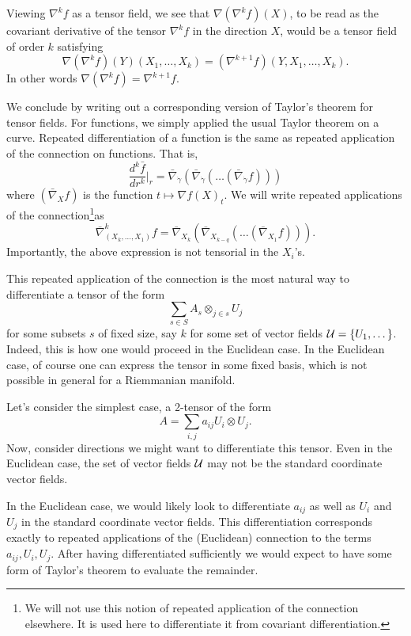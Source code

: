 \documentclass{article}
\begin{document}
Viewing $\nabla^{k} f$ as a tensor field, we see that $\nabla ( \nabla^k f)(X)$, to be read as the covariant derivative of the tensor $\nabla^k f$ in the direction
$X$, would be a tensor field of order $k$ satisfying
$$
\nabla(\nabla^k f)(Y)(X_1, \dots, X_k) = (\nabla^{k+1} f)(Y, X_1, \dots, X_k).
$$
In other words $\nabla (\nabla^k f) = \nabla^{k+1} f$.

We conclude by writing out a corresponding version of Taylor's theorem for tensor fields. For functions, we simply applied
the usual Taylor theorem on a curve. Repeated differentiation of a function is the same
as repeated application of the connection on functions. That is,
$$
\frac{d^k \bar{f}}{dr^k}\biggl|_r = \bar{\nabla}_{\dot{\gamma}} \left(\bar{\nabla}_{\dot{\gamma}}\left(\dots \left(\bar{\nabla}_{\dot{\gamma}}f\right) \right)\right)
$$
where $(\bar{\nabla}_{X}f)$ is  the function $t \mapsto \nabla f(X)_t$. We will write repeated applications of the connection\footnote{We will not use this notion
of repeated application of the connection elsewhere. It is used here to differentiate it from covariant differentiation.}as
$$
\bar{\nabla}^k_{(X_k, \dots, X_1)} f = \bar{\nabla}_{X_k}\left(\bar{\nabla}_{X_{k-q}} \left( \dots \left(\bar{\nabla}_{X_1}f\right)\right)\right).
$$
Importantly, the above expression is not tensorial in the $X_i$'s.

This repeated application of the connection is the most
natural way to differentiate a tensor of the form
$$
\sum_{s \in S} A_s \otimes_{j \in s} U_j
$$
for some subsets $s$ of fixed size, say $k$ for some set of vector fields ${\cal U} = \{U_1, \dots\}$. Indeed, this is how one would proceed in the Euclidean case. In the Euclidean case, of course one can express the tensor in some fixed basis, which is
not possible in general for a Riemmanian manifold.

Let's consider the simplest case, a 2-tensor of the form
$$
A = \sum_{i,j} a_{ij} U_i \otimes U_j.
$$
Now, consider directions we might want to differentiate this tensor. Even in the Euclidean case, the set of vector fields ${\cal U}$ may not be the standard
coordinate vector fields.

In the Euclidean case, we would likely look to differentiate $a_{ij}$ as well as $U_i$ and $U_j$ in the standard coordinate vector fields.
This differentiation corresponds exactly to repeated applications of the (Euclidean) connection to the terms $a_{ij}, U_i, U_j$.
After having
differentiated sufficiently we would expect to have some form of Taylor's theorem to evaluate the remainder.
\end{document}
